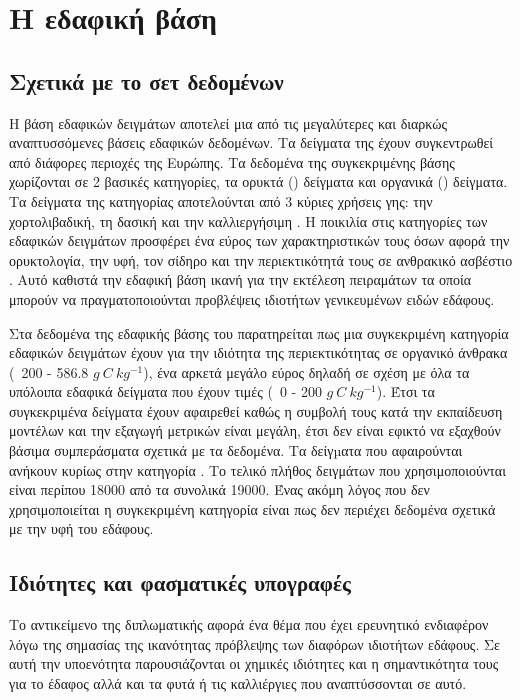 \chapter{Η εδαφική βάση  }

\section{Σχετικά με το σετ δεδομένων}
Η βάση εδαφικών δειγμάτων  αποτελεί μια από τις μεγαλύτερες και διαρκώς αναπτυσσόμενες βάσεις εδαφικών δεδομένων. Τα δείγματα της έχουν συγκεντρωθεί από διάφορες περιοχές της Ευρώπης. 
Τα δεδομένα της συγκεκριμένης βάσης χωρίζονται σε 2 βασικές κατηγορίες, τα ορυκτά () δείγματα και οργανικά () δείγματα. Τα δείγματα της κατηγορίας  αποτελούνται από 3 κύριες χρήσεις γης: την χορτολιβαδική, τη δασική και την καλλιεργήσιμη . Η ποικιλία στις κατηγορίες των εδαφικών δειγμάτων προσφέρει ένα εύρος των χαρακτηριστικών τους όσων αφορά την ορυκτολογία, την υφή, τον σίδηρο και την περιεκτικότητά τους σε ανθρακικό ασβέστιο \cite{nocita_lucas_soil}. Αυτό καθιστά την εδαφική βάση ικανή για την εκτέλεση πειραμάτων τα οποία μπορούν να πραγματοποιούνται προβλέψεις ιδιοτήτων γενικευμένων ειδών εδάφους.

Στα δεδομένα της εδαφικής βάσης του  παρατηρείται πως μια συγκεκριμένη κατηγορία εδαφικών δειγμάτων έχουν για την ιδιότητα της περιεκτικότητας σε οργανικό άνθρακα (~200 - 586.8 $g~C~kg^{-1}$), ένα αρκετά μεγάλο εύρος δηλαδή σε σχέση με όλα τα υπόλοιπα εδαφικά δείγματα που έχουν τιμές (~0 - 200 $g~C~kg^{-1}$). Έτσι τα συγκεκριμένα δείγματα έχουν αφαιρεθεί καθώς η συμβολή τους κατά την εκπαίδευση μοντέλων και την εξαγωγή μετρικών είναι μεγάλη, έτσι δεν είναι εφικτό να εξαχθούν βάσιμα συμπεράσματα σχετικά με τα δεδομένα. Τα δείγµατα που αφαιρούνται ανήκουν κυρίως στην κατηγορία . Το τελικό πλήθος δειγμάτων που χρησιμοποιούνται είναι περίπου 18000 από τα συνολικά 19000. Ένας ακόμη λόγος που δεν χρησιμοποιείται η συγκεκριμένη κατηγορία είναι πως δεν περιέχει δεδομένα σχετικά με την υφή του εδάφους.

\section{Ιδιότητες και φασματικές υπογραφές}
Το αντικείμενο της διπλωματικής αφορά ένα θέμα που έχει ερευνητικό ενδιαφέρον λόγω της σημασίας της ικανότητας πρόβλεψης των διαφόρων ιδιοτήτων εδάφους. Σε αυτή την υποενότητα παρουσιάζονται οι χημικές ιδιότητες και η σημαντικότητα τους για το έδαφος αλλά και τα φυτά ή τις καλλιέργιες που αναπτύσσονται σε αυτό.


